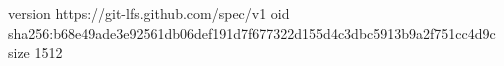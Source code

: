 version https://git-lfs.github.com/spec/v1
oid sha256:b68e49ade3e92561db06def191d7f677322d155d4c3dbc5913b9a2f751cc4d9c
size 1512
